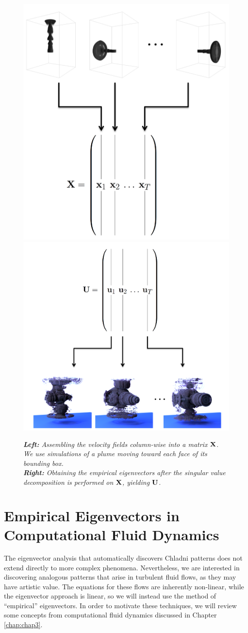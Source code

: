 \begin{figure}[H]
		\centering
		\includegraphics[height=0.45\textwidth]{chap5/figures/plume_inverted_training.png}
		\includegraphics[height=0.45\textwidth]{chap5/figures/U_trunc_T.png}
		\caption{{\em{\bf Left:} Assembling the velocity fields column-wise into a matrix $\mathbf{X}$. We use simulations of a plume moving toward each face of its bounding box.}\\{\em{\bf Right:} Obtaining the empirical eigenvectors after the singular value decomposition is performed on $\mathbf{X}$, yielding $\mathbf{U}$.}}
		\label{fig:matrices}
\end{figure}
\section{Empirical Eigenvectors in Computational Fluid Dynamics}

The eigenvector analysis that automatically discovers Chladni patterns does not extend directly to more complex phenomena. Nevertheless, we are interested in discovering analogous patterns that arise in turbulent fluid flows, as they may have artistic value. The equations for these flows are inherently non-linear, while the eigenvector approach is linear, so we will instead use the method of ``empirical'' eigenvectors. In order to motivate these techniques, we will review some concepts from computational fluid dynamics discussed in Chapter \ref{chap:chap3}.


